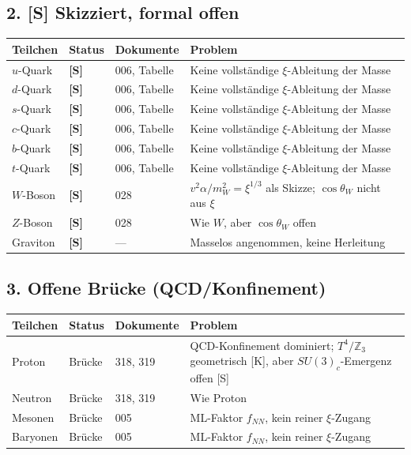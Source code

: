 \documentclass[11pt,a4paper]{article}
\begin{document}
	\subsection{2. [S] Skizziert, formal offen}
	\begin{longtable}{p{2.5cm}p{1.5cm}p{2cm}p{9.5cm}}
		\toprule
		\textbf{Teilchen} & \textbf{Status} & \textbf{Dokumente} & \textbf{Problem} \\
		\midrule
		\endhead
		\bottomrule
		\endfoot
		$u$-Quark & \textbf{[S]} & 006, Tabelle & Keine vollständige $\xi$-Ableitung der Masse \\
		$d$-Quark & \textbf{[S]} & 006, Tabelle & Keine vollständige $\xi$-Ableitung der Masse \\
		$s$-Quark & \textbf{[S]} & 006, Tabelle & Keine vollständige $\xi$-Ableitung der Masse \\
		$c$-Quark & \textbf{[S]} & 006, Tabelle & Keine vollständige $\xi$-Ableitung der Masse \\
		$b$-Quark & \textbf{[S]} & 006, Tabelle & Keine vollständige $\xi$-Ableitung der Masse \\
		$t$-Quark & \textbf{[S]} & 006, Tabelle & Keine vollständige $\xi$-Ableitung der Masse \\
		$W$-Boson & \textbf{[S]} & 028 & $v^2 \alpha / m_W^2 = \xi^{1/3}$ als Skizze; $\cos\theta_W$ nicht aus $\xi$ \\
		$Z$-Boson & \textbf{[S]} & 028 & Wie $W$, aber $\cos\theta_W$ offen \\
		Graviton & \textbf{[S]} & --- & Masselos angenommen, keine Herleitung \\
	\end{longtable}
	
	\subsection{3. Offene Brücke (QCD/Konfinement)}
	\begin{longtable}{p{2.5cm}p{1.5cm}p{2cm}p{9.5cm}}
		\toprule
		\textbf{Teilchen} & \textbf{Status} & \textbf{Dokumente} & \textbf{Problem} \\
		\midrule
		\endhead
		\bottomrule
		\endfoot
		Proton & Brücke & 318, 319 & QCD-Konfinement dominiert; $T^4/\mathbb{Z}_3$ geometrisch [K], aber $SU(3)_c$-Emergenz offen [S] \\
		Neutron & Brücke & 318, 319 & Wie Proton \\
		Mesonen & Brücke & 005 & ML-Faktor $f_{NN}$, kein reiner $\xi$-Zugang \\
		Baryonen & Brücke & 005 & ML-Faktor $f_{NN}$, kein reiner $\xi$-Zugang \\
	\end{longtable}
	
\end{document}
